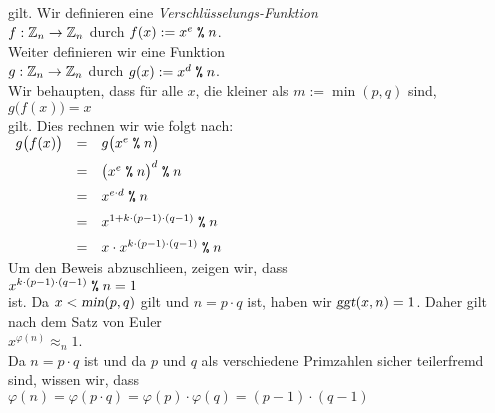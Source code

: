 \\[0.2cm]
gilt.  
Wir definieren eine \emph{Verschl\"{u}sselungs-Funktion}
\\[0.2cm]
\hspace*{1.3cm}
$f: \mathbb{Z}_{n} \rightarrow \mathbb{Z}_{n}$ \quad durch \quad $f(x) := x^e \;\texttt{\%}\; n$.
\\[0.2cm]
Weiter definieren wir eine Funktion
\\[0.2cm]
\hspace*{1.3cm}
$g: \mathbb{Z}_{n} \rightarrow \mathbb{Z}_{n}$ \quad durch \quad $g(x) := x^d \;\texttt{\%}\; n$.
\\[0.2cm]
Wir behaupten, dass f\"{u}r alle $x$, die kleiner als $m := \min(p,q)$ sind, 
\\[0.2cm]
\hspace*{1.3cm}
$g\bigl(f(x)\bigr) = x$ 
\\[0.2cm]
gilt.  Dies rechnen wir wie folgt nach:
\\[0.2cm]
\hspace*{1.3cm}
$
\begin{array}[t]{lcl}
  g\bigl(f(x)\bigr) & = & g\bigl(x^e \;\texttt{\%}\; n\bigr)                      \\[0.2cm]
                    & = & \bigl(x^e \;\texttt{\%}\; n\bigr)^d \;\texttt{\%}\; n           \\[0.2cm]
                    & = & x^{e \cdot d} \;\texttt{\%}\; n                         \\[0.2cm]
                    & = & x^{1 + k \cdot (p-1) \cdot (q-1)} \;\texttt{\%}\; n     \\[0.2cm]
                    & = & x \cdot x^{k \cdot (p-1) \cdot (q-1)} \;\texttt{\%}\; n 
\end{array}
$
\\[0.2cm]
Um den Beweis abzuschlie\3en, zeigen wir, dass
\\[0.2cm]
\hspace*{1.3cm}
$x^{k \cdot (p-1) \cdot (q-1)} \;\texttt{\%}\; n = 1$
\\[0.2cm]
ist.   Da $x < \textsl{min}(p,q)$ gilt und $n = p \cdot q$ ist, haben wir $\textsl{ggt}(x,n) = 1$.
Daher gilt nach dem Satz von Euler 
\\[0.2cm]
\hspace*{1.3cm}
$x^{\varphi(n)} \approx_n 1$.
\\[0.2cm]
Da $n = p \cdot q$ ist und da $p$ und $q$ als verschiedene Primzahlen sicher teilerfremd sind, wissen
wir, dass
\\[0.2cm]
\hspace*{1.3cm}
$\varphi(n) = \varphi(p \cdot q) = \varphi(p) \cdot \varphi(q) = (p-1) \cdot (q-1)$
